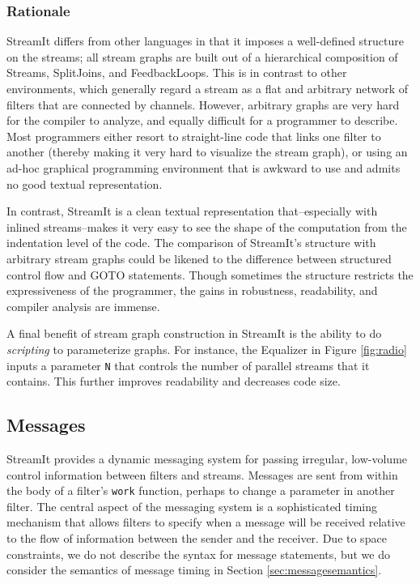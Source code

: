 \subsubsection{Rationale}

StreamIt differs from other languages in that it imposes a
well-defined structure on the streams; all stream graphs are built out
of a hierarchical composition of Streams, SplitJoins, and
FeedbackLoops.  This is in contrast to other environments, which
generally regard a stream as a flat and arbitrary network of filters
that are connected by channels.  However, arbitrary graphs are very
hard for the compiler to analyze, and equally difficult for a
programmer to describe.  Most programmers either resort to
straight-line code that links one filter to another (thereby making it
very hard to visualize the stream graph), or using an ad-hoc graphical
programming environment that is awkward to use and admits no good
textual representation.

In contrast, StreamIt is a clean textual representation
that--especially with inlined streams--makes it very easy to see the
shape of the computation from the indentation level of the code.  The
comparison of StreamIt's structure with arbitrary stream graphs could
be likened to the difference between structured control flow and GOTO
statements.  Though sometimes the structure restricts the
expressiveness of the programmer, the gains in robustness,
readability, and compiler analysis are immense.

A final benefit of stream graph construction in StreamIt is the
ability to do {\it scripting} to parameterize graphs.  For instance,
the Equalizer in Figure \ref{fig:radio} inputs a parameter {\tt N}
that controls the number of parallel streams that it contains.  This
further improves readability and decreases code size.

\subsection{Messages}

StreamIt provides a dynamic messaging system for passing irregular,
low-volume control information between filters and streams.  Messages
are sent from within the body of a filter's {\tt work} function,
perhaps to change a parameter in another filter.  The central aspect
of the messaging system is a sophisticated timing mechanism that
allows filters to specify when a message will be received relative to
the flow of information between the sender and the receiver.  Due to
space constraints, we do not describe the syntax for message
statements, but we do consider the semantics of message timing in
Section \ref{sec:messagesemantics}.

